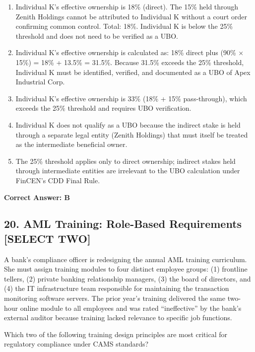 \documentclass[11pt,a4paper]{article}
\begin{document}
	\begin{enumerate}[label=\Alph*.]
		\item Individual K's effective ownership is 18\% (direct). The 15\% held through Zenith Holdings cannot be attributed to Individual K without a court order confirming common control. Total: 18\%. Individual K is below the 25\% threshold and does not need to be verified as a UBO.
		\item Individual K's effective ownership is calculated as: 18\% direct plus (90\% $\times$ 15\%) = 18\% + 13.5\% = 31.5\%. Because 31.5\% exceeds the 25\% threshold, Individual K must be identified, verified, and documented as a UBO of Apex Industrial Corp.
		\item Individual K's effective ownership is 33\% (18\% + 15\% pass-through), which exceeds the 25\% threshold and requires UBO verification.
		\item Individual K does not qualify as a UBO because the indirect stake is held through a separate legal entity (Zenith Holdings) that must itself be treated as the intermediate beneficial owner.
		\item The 25\% threshold applies only to direct ownership; indirect stakes held through intermediate entities are irrelevant to the UBO calculation under FinCEN's CDD Final Rule.
	\end{enumerate}
	\textbf{Correct Answer: B}
	
	\subsection{20. AML Training: Role-Based Requirements \textnormal{[SELECT TWO]}}
	
	A bank's compliance officer is redesigning the annual AML training curriculum. She must assign training modules to four distinct employee groups: (1) frontline tellers, (2) private banking relationship managers, (3) the board of directors, and (4) the IT infrastructure team responsible for maintaining the transaction monitoring software servers. The prior year's training delivered the same two-hour online module to all employees and was rated ``ineffective'' by the bank's external auditor because training lacked relevance to specific job functions.
	
	Which two of the following training design principles are most critical for regulatory compliance under CAMS standards?
	
\end{document}
